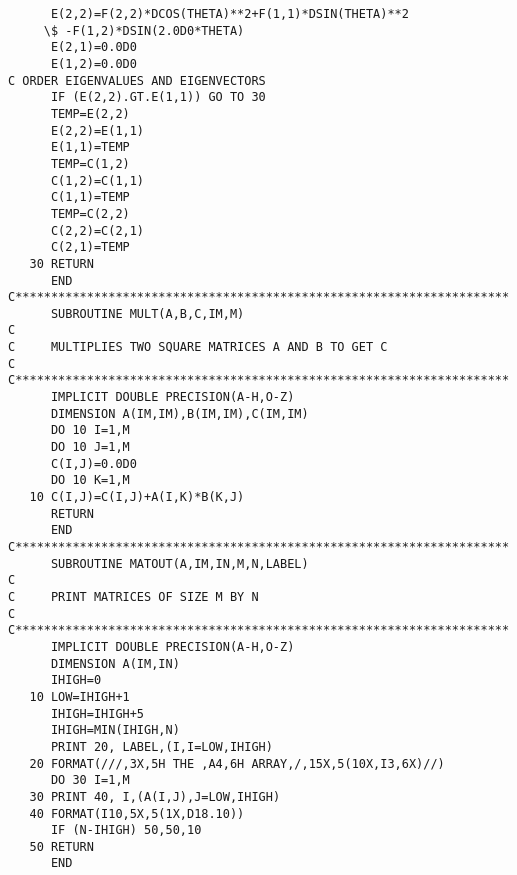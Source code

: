 \begin{verbatim}
      E(2,2)=F(2,2)*DCOS(THETA)**2+F(1,1)*DSIN(THETA)**2
     \$ -F(1,2)*DSIN(2.0D0*THETA)
      E(2,1)=0.0D0
      E(1,2)=0.0D0
C ORDER EIGENVALUES AND EIGENVECTORS
      IF (E(2,2).GT.E(1,1)) GO TO 30
      TEMP=E(2,2)
      E(2,2)=E(1,1)
      E(1,1)=TEMP
      TEMP=C(1,2)
      C(1,2)=C(1,1)
      C(1,1)=TEMP
      TEMP=C(2,2)
      C(2,2)=C(2,1)
      C(2,1)=TEMP
   30 RETURN
      END
C*********************************************************************
      SUBROUTINE MULT(A,B,C,IM,M)
C
C     MULTIPLIES TWO SQUARE MATRICES A AND B TO GET C
C
C*********************************************************************
      IMPLICIT DOUBLE PRECISION(A-H,O-Z)
      DIMENSION A(IM,IM),B(IM,IM),C(IM,IM)
      DO 10 I=1,M
      DO 10 J=1,M
      C(I,J)=0.0D0
      DO 10 K=1,M
   10 C(I,J)=C(I,J)+A(I,K)*B(K,J)
      RETURN
      END
C*********************************************************************
      SUBROUTINE MATOUT(A,IM,IN,M,N,LABEL)
C
C     PRINT MATRICES OF SIZE M BY N
C
C*********************************************************************
      IMPLICIT DOUBLE PRECISION(A-H,O-Z)
      DIMENSION A(IM,IN)
      IHIGH=0
   10 LOW=IHIGH+1
      IHIGH=IHIGH+5
      IHIGH=MIN(IHIGH,N)
      PRINT 20, LABEL,(I,I=LOW,IHIGH)
   20 FORMAT(///,3X,5H THE ,A4,6H ARRAY,/,15X,5(10X,I3,6X)//)
      DO 30 I=1,M
   30 PRINT 40, I,(A(I,J),J=LOW,IHIGH)
   40 FORMAT(I10,5X,5(1X,D18.10))
      IF (N-IHIGH) 50,50,10
   50 RETURN
      END
\end{verbatim}

